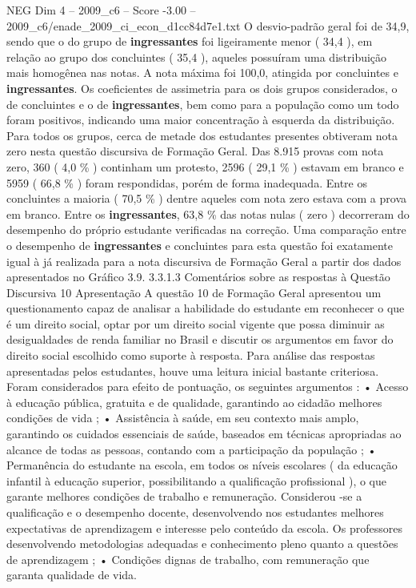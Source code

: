\begin{textsample}{NEG Dim 4 – 2009\_c6 – Score -3.00 – 2009\_c6/enade\_2009\_ci\_econ\_d1cc84d7e1.txt}
O desvio-padrão geral foi de 34,9, sendo que o do grupo de \textbf{ingressantes} foi ligeiramente menor ( 34,4 ), em relação ao grupo dos concluintes ( 35,4 ), aqueles possuíram uma distribuição mais homogênea nas notas.
A nota máxima foi 100,0, atingida por concluintes e \textbf{ingressantes}.
Os coeficientes de assimetria para os dois grupos considerados, o de concluintes e o de \textbf{ingressantes}, bem como para a população como um todo foram positivos, indicando uma maior concentração à esquerda da distribuição.
Para todos os grupos, cerca de metade dos estudantes presentes obtiveram nota zero nesta questão discursiva de Formação Geral.
Das 8.915 provas com nota zero, 360 ( 4,0 \% ) continham um protesto, 2596 ( 29,1 \% ) estavam em branco e 5959 ( 66,8 \% ) foram respondidas, porém de forma inadequada.
Entre os concluintes a maioria ( 70,5 \% ) dentre aqueles com nota zero estava com a prova em branco.
Entre os \textbf{ingressantes}, 63,8 \% das notas nulas ( zero ) decorreram do desempenho do próprio estudante verificadas na correção.
Uma comparação entre o desempenho de \textbf{ingressantes} e concluintes para esta questão foi exatamente igual à já realizada para a nota discursiva de Formação Geral a partir dos dados apresentados no Gráfico 3.9. 3.3.1.3 Comentários sobre as respostas à Questão Discursiva 10 Apresentação A questão 10 de Formação Geral apresentou um questionamento capaz de analisar a habilidade do estudante em reconhecer o que é um direito social, optar por um direito social vigente que possa diminuir as desigualdades de renda familiar no Brasil e discutir os argumentos em favor do direito social escolhido como suporte à resposta.
Para análise das respostas apresentadas pelos estudantes, houve uma leitura inicial bastante criteriosa.
Foram considerados para efeito de pontuação, os seguintes argumentos : • Acesso à educação pública, gratuita e de qualidade, garantindo ao cidadão melhores condições de vida ; • Assistência à saúde, em seu contexto mais amplo, garantindo os cuidados essenciais de saúde, baseados em técnicas apropriadas ao alcance de todas as pessoas, contando com a participação da população ; • Permanência do estudante na escola, em todos os níveis escolares ( da educação infantil à educação superior, possibilitando a qualificação profissional ), o que garante melhores condições de trabalho e remuneração.
Considerou -se a qualificação e o desempenho docente, desenvolvendo nos estudantes melhores expectativas de aprendizagem e interesse pelo conteúdo da escola.
Os professores desenvolvendo metodologias adequadas e conhecimento pleno quanto a questões de aprendizagem ; • Condições dignas de trabalho, com remuneração que garanta qualidade de vida.

\end{textsample}
